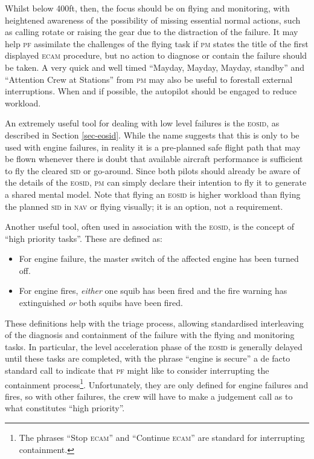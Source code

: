 \documentclass[a5paper,11pt,twoside]{book}
\newcommand{\ac}[1]{{\scshape\MakeLowercase{#1}}}
\begin{document}
Whilst below 400ft, then, the focus should be on flying and monitoring, with
heightened awareness of the possibility of missing essential normal actions,
such as calling rotate or raising the gear due to the distraction of the
failure. It may help \ac{PF} assimilate the challenges of the flying task if
\ac{PM} states the title of the first displayed \ac{ECAM} procedure, but no
action to diagnose or contain the failure should be taken. A very quick and well
timed ``Mayday, Mayday, Mayday, standby'' and ``Attention Crew at Stations''
from \ac{PM} may also be useful to forestall external interruptions. When and if
possible, the autopilot should be engaged to reduce workload.

An extremely useful tool for dealing with low level failures is the \ac{EOSID},
as described in Section \ref{sec-eosid}. While the name suggests that this is
only to be used with engine failures, in reality it is a pre-planned safe flight
path that may be flown whenever there is doubt that available aircraft
performance is sufficient to fly the cleared \ac{SID} or go-around. Since both
pilots should already be aware of the details of the \ac{EOSID}, \ac{PM} can
simply declare their intention to fly it to generate a shared mental model.
Note that flying an \ac{EOSID} is higher workload than flying the planned
\ac{SID} in \ac{NAV} or flying visually; it is an option, not a requirement.

Another useful tool, often used in association with the \ac{EOSID}, is the
concept of ``high priority tasks''. These are defined as:

\begin{itemize}
\item For engine failure, the master switch of the affected engine has been
  turned off.

\item For engine fires, \emph{either} one squib has been fired and the fire
  warning has extinguished \emph{or} both squibs have been fired.
\end{itemize}

These definitions help with the triage process, allowing standardised
interleaving of the diagnosis and containment of the failure with the flying and
monitoring tasks. In particular, the level acceleration phase of the \ac{EOSID}
is generally delayed until these tasks are completed, with the phrase ``engine
is secure'' a de facto standard call to indicate that \ac{PF} might like to
consider interrupting the containment process\footnote{The phrases ``Stop
\ac{ECAM}'' and ``Continue \ac{ECAM}'' are standard for interrupting
containment.}.  Unfortunately, they are only defined for engine failures and
fires, so with other failures, the crew will have to make a judgement call as to
what constitutes ``high priority''.
\end{document}
